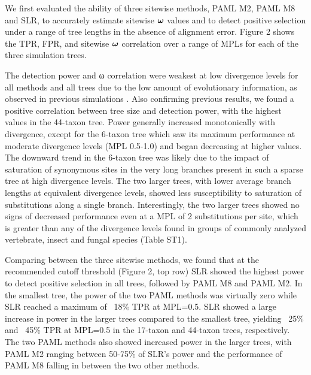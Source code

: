 \documentclass{mbe}
\begin{document}
We first evaluated the ability of three sitewise methods, PAML M2,
PAML M8 and SLR, to accurately estimate sitewise $\bm{\omega}{}$ values and to
detect positive selection under a range of tree lengths in the absence
of alignment error. Figure 2 shows the TPR, FPR, \tpr{} and sitewise $\bm{\omega}{}$
correlation over a range of MPLs for each of the three simulation
trees.

The detection power and ω correlation were weakest at low divergence
levels for all methods and all trees due to the low amount of
evolutionary information, as observed in previous simulations
\citep{Anisimova2002Accuracy}. Also confirming previous results, we
found a positive correlation between tree size and detection power,
with the highest values in the 44-taxon tree. Power generally
increased monotonically with divergence, except for the 6-taxon tree
which saw its maximum performance at moderate divergence levels (MPL
0.5-1.0) and began decreasing at higher values. The downward trend in
the 6-taxon tree was likely due to the impact of saturation of
synonymous sites in the very long branches present in such a sparse
tree at high divergence levels. The two larger trees, with lower
average branch lengths at equivalent divergence levels, showed less
susceptibility to saturation of substitutions along a single
branch. Interestingly, the two larger trees showed no signs of
decreased performance even at a MPL of 2 substitutions per site, which
is greater than any of the divergence levels found in groups of
commonly analyzed vertebrate, insect and fungal species (Table ST1).

Comparing between the three sitewise methods, we found that at the
recommended cutoff threshold (Figure 2, top row) SLR showed the
highest power to detect positive selection in all trees, followed by
PAML M8 and PAML M2. In the smallest tree, the power of the two PAML
methods was virtually zero while SLR reached a maximum of ~18\% TPR at
MPL=0.5. SLR showed a large increase in power in the larger trees
compared to the smallest tree, yielding ~25\% and ~45\% TPR at MPL=0.5
in the 17-taxon and 44-taxon trees, respectively. The two PAML methods
also showed increased power in the larger trees, with PAML M2 ranging
between 50-75\% of SLR’s power and the performance of PAML M8 falling
in between the two other methods.
\end{document}
